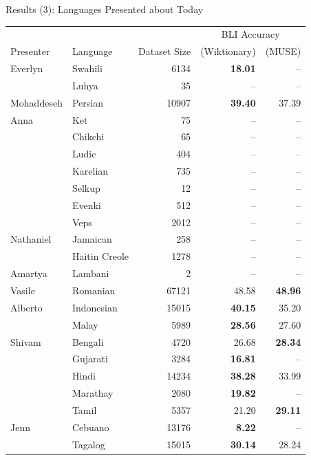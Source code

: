 \documentclass{beamer}
\begin{document}
\begin{frame}{Results (3): Languages Presented about Today}
    \tiny
    \centering
    \begin{tabular}{llrrr}
        \toprule
        & & & \multicolumn{2}{c}{BLI Accuracy} \\
        \cmidrule{4-5}
        Presenter & Language & Dataset Size & (Wiktionary)& (MUSE) \\
        \midrule
        Everlyn & Swahili           & 6134 & \textbf{18.01} & --\\
                & Luhya             & 35  & -- & --\\
        \midrule
        Mohaddeseh & Persian           & 10907 & \textbf{39.40} & 37.39 \\
        \midrule
        Anna & Ket & 75  & -- & --\\
             & Chikchi & 65  & -- & --\\
             & Ludic & 404  & -- & --\\
             & Karelian & 735  & -- & --\\
             & Selkup & 12  & -- & --\\
             & Evenki & 512  & -- & --\\
             & Veps & 2012  & -- & --\\
         \midrule
            Nathaniel & Jamaican          & 258   & -- & --\\
                      & Haitin Creole     & 1278   & -- & --\\
                      \midrule
                      Amartya & Lambani & 2 & -- & -- \\
                      \midrule
                      Vasile & Romanian & 67121 & 48.58 & \textbf{48.96} \\
                      \midrule
                      Alberto & Indonesian & 15015 & \textbf{40.15} & 35.20 \\
                      & Malay & 5989 & \textbf{28.56} & 27.60 \\
                      \midrule
            Shivam  & Bengali & 4720 & 26.68 & \textbf{28.34} \\
                    & Gujarati & 3284 & \textbf{16.81} & -- \\
                    & Hindi & 14234 & \textbf{38.28} & 33.99 \\
                    & Marathay & 2080 & \textbf{19.82} & -- \\
                    & Tamil & 5357 & 21.20 & \textbf{29.11} \\
                      \midrule
            Jenn      & Cebuano & 13176 & \textbf{8.22} & -- \\
                      & Tagalog & 15015 & \textbf{30.14} & 28.24 \\
        \bottomrule
    \end{tabular}
%
\end{frame}
\end{document}

